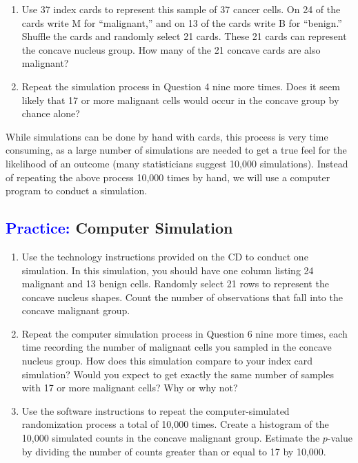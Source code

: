 \documentclass[
]{report}
\begin{document}
\begin{enumerate}
\def\labelenumi{\arabic{enumi}.}
\setcounter{enumi}{3}
\item
  Use 37 index cards to represent this sample of 37 cancer cells. On 24 of the cards write M for ``malignant,'' and on 13 of the cards write B for ``benign.'' Shuffle the cards and randomly select 21 cards. These
  21 cards can represent the concave nucleus group. How many of the 21 concave cards are also malignant?
\item
  Repeat the simulation process in Question 4 nine more times. Does it seem likely that 17 or more malignant cells would occur in the concave group by chance alone?
\end{enumerate}

While simulations can be done by hand with cards, this process is very time consuming, as a large number of simulations are needed to get a true feel for the likelihood of an outcome (many statisticians suggest 10,000 simulations). Instead of repeating the above process 10,000 times by hand, we will use a computer program to conduct a simulation.

\hypertarget{computer-simulation}{%
\subsection*{\texorpdfstring{\textcolor{blue}{Practice:} Computer Simulation}{ Computer Simulation}}\label{computer-simulation}}

\begin{enumerate}
\def\labelenumi{\arabic{enumi}.}
\setcounter{enumi}{5}
\item
  Use the technology instructions provided on the CD to conduct one simulation. In this simulation, you should have one column listing 24 malignant and 13 benign cells. Randomly select 21 rows to represent
  the concave nucleus shapes. Count the number of observations that fall into the concave malignant group.
\item
  Repeat the computer simulation process in Question 6 nine more times, each time recording the number of malignant cells you sampled in the concave nucleus group. How does this simulation compare to
  your index card simulation? Would you expect to get exactly the same number of samples with 17 or more malignant cells? Why or why not?
\item
  Use the software instructions to repeat the computer-simulated randomization process a total of 10,000 times. Create a histogram of the 10,000 simulated counts in the concave malignant group. Estimate the
  \(\scriptstyle p\)-value by dividing the number of counts greater than or equal to 17 by 10,000.
\end{enumerate}
\end{document}
